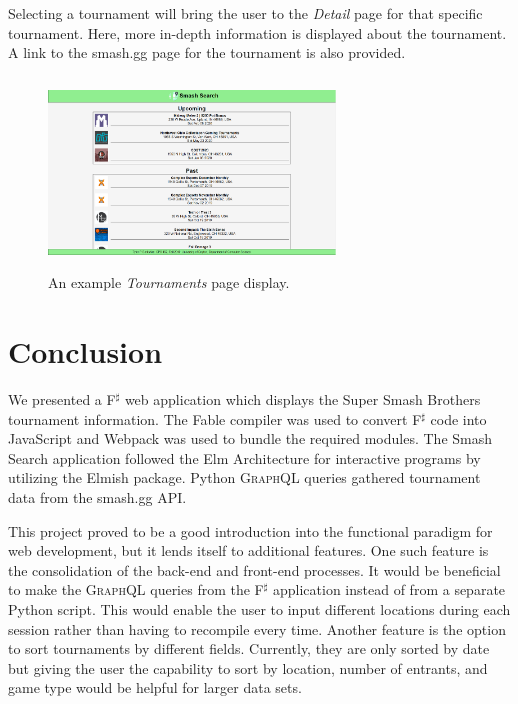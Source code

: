 \documentclass[sigconf]{acmart}
\begin{document}
Selecting a tournament will bring the user to the \textit{Detail} page for that specific tournament. Here, more in-depth information is displayed about the tournament. A link to the smash.gg page for the tournament is also provided.

\begin{figure}
\includegraphics[height=2.0in, width=3in]{smashsearch}
\caption{An example \textit{Tournaments} page display.}\label{smashsearch}\end{figure}

\section{Conclusion}

We presented a F$^{\sharp}$ web application which displays the Super Smash Brothers tournament information. The Fable compiler was used to convert F$^{\sharp}$ code into JavaScript and Webpack was used to bundle the required modules. The Smash Search application followed the Elm Architecture for interactive programs by utilizing the Elmish package. Python \textsc{GraphQL} queries gathered tournament data from the smash.gg \textsc{API}.

This project proved to be a good introduction into the functional paradigm for web development, but it lends itself to additional features. One such feature is the consolidation of the back-end and front-end processes. It would be beneficial to make the \textsc{GraphQL} queries from the F$^{\sharp}$ application instead of from a separate Python script. This would enable the user to input different locations during each session rather than having to recompile every time. Another feature is the option to sort tournaments by different fields. Currently, they are only sorted by date but giving the user the capability to sort by location, number of entrants, and game type would be helpful for larger data sets.




\balance
\end{document}
